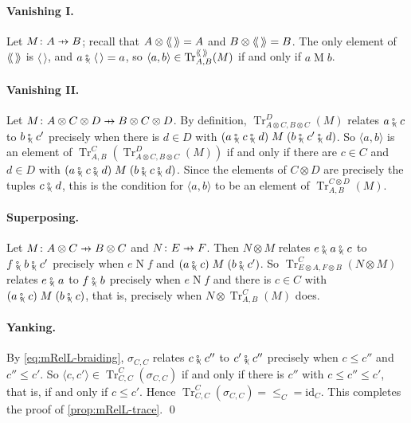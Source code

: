 \documentclass[11pt,a4paper]{article}
\theoremstyle{plain}
\theoremstyle{definition}
\theoremstyle{remark}
\providecommand{\llangle}{\mathopen{\langle\mkern-3.5mu\langle}}
\providecommand{\rrangle}{\mathclose{\rangle\mkern-3.5mu\rangle}}
\newcommand{\tL}[1]{\llangle #1 \rrangle}
\newcommand{\tc}{\mathbin{\fatsemi_{\!\scriptscriptstyle\langle}}}
\newcommand{\tup}[1]{\langle #1 \rangle}
\newcommand{\etup}{\langle\,\rangle}
\newcommand{\profto}{\mathrel{\ooalign{\hfil$\mapstochar\mkern 5mu$\hfil\cr$\to$\cr}}}
\newcommand{\rel}[3]{#1 \mathrel{#2} #3}
\DeclareMathOperator{\Tr}{Tr}
\newcommand{\id}{\mathrm{id}}
\begin{document}
\paragraph{Vanishing I.}
Let $M \colon A \profto B$; recall that $A \otimes \tL{\,} = A$ and $B \otimes \tL{\,} = B$.
The only element of $\tL{\,}$ is $\etup$, and $a \tc \etup = a$, so $\tup{a,b} \in \Tr^{\tL{\,}}_{A,B}(M)$ if and only if $\rel{a}{M}{b}$.

\paragraph{Vanishing II.}
Let $M \colon A \otimes C \otimes D \profto B \otimes C \otimes D$.
By definition, $\Tr^{D}_{A \otimes C, B \otimes C}(M)$ relates $a \tc c$ to $b \tc c'$ precisely when there is $d \in D$ with $\rel{(a \tc c \tc d)}{M}{(b \tc c' \tc d)}$.
So $\tup{a,b}$ is an element of $\Tr^{C}_{A,B}(\Tr^{D}_{A \otimes C, B \otimes C}(M))$ if and only if there are $c \in C$ and $d \in D$ with $\rel{(a \tc c \tc d)}{M}{(b \tc c \tc d)}$.
Since the elements of $C \otimes D$ are precisely the tuples $c \tc d$, this is the condition for $\tup{a,b}$ to be an element of $\Tr^{C \otimes D}_{A,B}(M)$.

\paragraph{Superposing.}
Let $M \colon A \otimes C \profto B \otimes C$ and $N \colon E \profto F$.
Then $N \otimes M$ relates $e \tc a \tc c$ to $f \tc b \tc c'$ precisely when $\rel{e}{N}{f}$ and $\rel{(a \tc c)}{M}{(b \tc c')}$.
So $\Tr^{C}_{E \otimes A, F \otimes B}(N \otimes M)$ relates $e \tc a$ to $f \tc b$ precisely when $\rel{e}{N}{f}$ and there is $c \in C$ with $\rel{(a \tc c)}{M}{(b \tc c)}$, that is, precisely when $N \otimes \Tr^{C}_{A,B}(M)$ does.

\paragraph{Yanking.}
By \cref{eq:mRelL-braiding}, $\sigma_{C,C}$ relates $c \tc c''$ to $c' \tc c''$ precisely when $c \leq c''$ and $c'' \leq c'$.
So $\tup{c,c'} \in \Tr^{C}_{C,C}(\sigma_{C,C})$ if and only if there is $c''$ with $c \leq c'' \leq c'$, that is, if and only if $c \leq c'$.
Hence $\Tr^{C}_{C,C}(\sigma_{C,C}) = {\leq_C} = \id_C$.
This completes the proof of \cref{prop:mRelL-trace}. \qed
\end{document}
